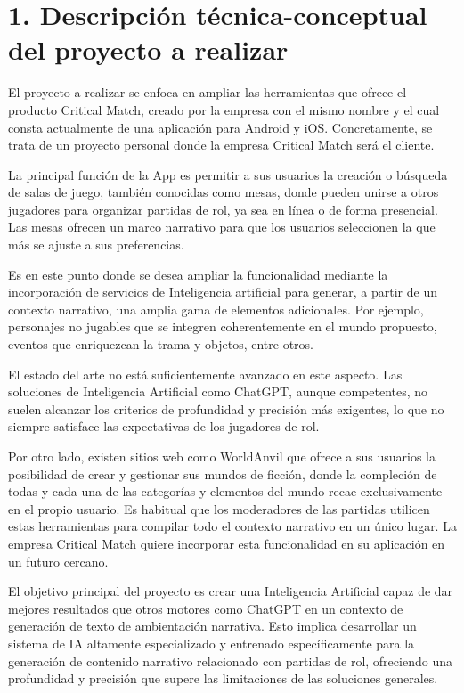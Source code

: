 \documentclass[
11pt, %
]{Clases/charter}
\begin{document}
\section{1. Descripción técnica-conceptual del proyecto a realizar}
\label{sec:descripcion}
El proyecto a realizar se enfoca en ampliar las herramientas que ofrece el producto Critical Match,
creado por la empresa con el mismo nombre y el cual consta actualmente de una aplicación para Android y iOS.
Concretamente, se trata de un proyecto personal donde la empresa Critical Match será el cliente.

La principal función de la App es permitir a sus usuarios la creación o búsqueda de salas de juego,
también conocidas como mesas, donde pueden unirse a otros jugadores para organizar partidas de rol,
ya sea en línea o de forma presencial.
Las mesas ofrecen un marco narrativo para que los usuarios seleccionen la que más se ajuste a sus preferencias.

Es en este punto donde se desea ampliar la funcionalidad mediante la incorporación de servicios de Inteligencia artificial para generar,
a partir de un contexto narrativo, una amplia gama de elementos adicionales.
Por ejemplo, personajes no jugables que se integren coherentemente en el mundo propuesto,
eventos que enriquezcan la trama y objetos, entre otros.

El estado del arte no está suficientemente avanzado en este aspecto.
Las soluciones de Inteligencia Artificial como ChatGPT, aunque competentes,
no suelen alcanzar los criterios de profundidad y precisión más exigentes,
lo que no siempre satisface las expectativas de los jugadores de rol.

Por otro lado, existen sitios web como WorldAnvil que ofrece a sus usuarios la posibilidad de crear y gestionar sus mundos de ficción,
donde la compleción de todas y cada una de las categorías y elementos del mundo recae exclusivamente en el propio usuario.
Es habitual que los moderadores de las partidas utilicen estas herramientas para compilar todo el contexto narrativo en un único lugar.
La empresa Critical Match quiere incorporar esta funcionalidad en su aplicación en un futuro cercano.

El objetivo principal del proyecto es crear una Inteligencia Artificial capaz de dar mejores resultados que otros motores como ChatGPT en un contexto de generación de texto de ambientación narrativa.
Esto implica desarrollar un sistema de IA altamente especializado y entrenado específicamente para la generación de contenido narrativo relacionado con partidas de rol, ofreciendo una profundidad y precisión que supere las limitaciones de las soluciones generales.
\end{document}
